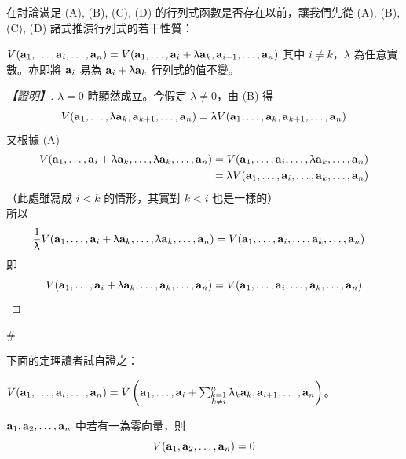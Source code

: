 在討論滿足 (A), (B), (C), (D) 的行列式函數是否存在以前，讓我們先從 (A), (B), (C), (D) 諸式推演行列式的若干性質：

\begin{theorem}\label{thm:b6s-1-2}
$V(\vect{a}_1, \dots, \vect{a}_i, \dots, \vect{a}_n) = V(\vect{a}_1, \dots, \vect{a}_i + \lambda\vect{a}_k, \vect{a}_{i+1}, \dots, \vect{a}_n)$ 其中 $i \ne k$，$\lambda$ 為任意實數。亦即將 $\vect{a}_i$ 易為 $\vect{a}_i + \lambda\vect{a}_k$ 行列式的值不變。
\end{theorem}

\begin{proof}[【證明】]
$\lambda=0$ 時顯然成立。今假定 $\lambda \ne 0$，由 (B) 得
\[ V(\vect{a}_1, \dots, \lambda\vect{a}_k, \vect{a}_{k+1}, \dots, \vect{a}_n) = \lambda V(\vect{a}_1, \dots, \vect{a}_k, \vect{a}_{k+1}, \dots, \vect{a}_n) \]
又根據 (A)
\begin{align*}
V(\vect{a}_1, \dots, \vect{a}_i + \lambda\vect{a}_k, \dots, \lambda\vect{a}_k, \dots, \vect{a}_n) &= V(\vect{a}_1, \dots, \vect{a}_i, \dots, \lambda\vect{a}_k, \dots, \vect{a}_n) \\
&= \lambda V(\vect{a}_1, \dots, \vect{a}_i, \dots, \vect{a}_k, \dots, \vect{a}_n)
\end{align*}
（此處雖寫成 $i < k$ 的情形，其實對 $k < i$ 也是一樣的）\\
所以
\begin{align*}
\dfrac{1}{\lambda} V(\vect{a}_1, \dots, \vect{a}_i + \lambda\vect{a}_k, \dots, \lambda\vect{a}_k, \dots, \vect{a}_n) &= V(\vect{a}_1, \dots, \vect{a}_i, \dots, \vect{a}_k, \dots, \vect{a}_n)
\end{align*}
即
\[ V(\vect{a}_1, \dots, \vect{a}_i + \lambda\vect{a}_k, \dots, \vect{a}_k, \dots, \vect{a}_n) = V(\vect{a}_1, \dots, \vect{a}_i, \dots, \vect{a}_k, \dots, \vect{a}_n) \]
\end{proof}\hfill$\#$

下面的定理讀者試自證之：

\begin{theorem}\label{thm:b6s-1-3}
$V(\vect{a}_1, \dots, \vect{a}_i, \dots, \vect{a}_n) = V\left(\vect{a}_1, \dots, \vect{a}_i + \sum_{\substack{k=1\\ k\ne i}}^n \lambda_k \vect{a}_k, \vect{a}_{i+1}, \dots, \vect{a}_n\right)$。
\end{theorem}

\begin{theorem}\label{thm:b6s-1-4}
$\vect{a}_1, \vect{a}_2, \dots, \vect{a}_n$ 中若有一為零向量，則
\[ V(\vect{a}_1, \vect{a}_2, \dots, \vect{a}_n) = 0 \]
\end{theorem}

